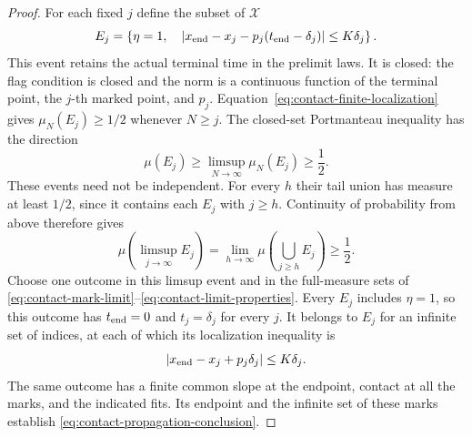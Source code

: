 \begin{proof}
For each fixed $j$ define the subset of $\mathcal X$
\[
  E_j=\left\{\eta=1,\quad
      |x_{\rm end}-x_j-p_j(t_{\rm end}-\delta_j)|\le K\delta_j\right\}.
\]
This event retains the actual terminal time in the prelimit laws.
It is closed: the flag condition is closed and the norm is a continuous
function of the terminal point, the $j$-th marked point, and $p_j$.
Equation~\eqref{eq:contact-finite-localization} gives
$\mu_N(E_j)\ge1/2$ whenever $N\ge j$.  The
closed-set Portmanteau inequality has the direction
\[
  \mu(E_j)\ge\limsup_{N\to\infty}\mu_N(E_j)\ge\frac12.
\]
These events need not be independent.  For every $h$ their tail union has
measure at least $1/2$, since it contains each $E_j$ with $j\ge h$.  Continuity of
probability from above therefore gives
\[
  \mu\left(\limsup_{j\to\infty}E_j\right)
   =\lim_{h\to\infty}\mu\left(\bigcup_{j\ge h}E_j\right)\ge\frac12.
\]
Choose one outcome in this limsup event and in the full-measure sets of
\eqref{eq:contact-mark-limit}--\eqref{eq:contact-limit-properties}.  Every
$E_j$ includes $\eta=1$, so this outcome has $t_{\rm end}=0$ and
$t_j=\delta_j$ for every $j$.  It belongs to $E_j$ for an infinite set of
indices, at each of which its localization inequality is
\[
  |x_{\rm end}-x_j+p_j\delta_j|\le K\delta_j.
\]
The same outcome has a finite common slope at the endpoint, contact at all
the marks, and the indicated fits.  Its endpoint and the infinite set of
these marks establish \eqref{eq:contact-propagation-conclusion}.
\end{proof}
